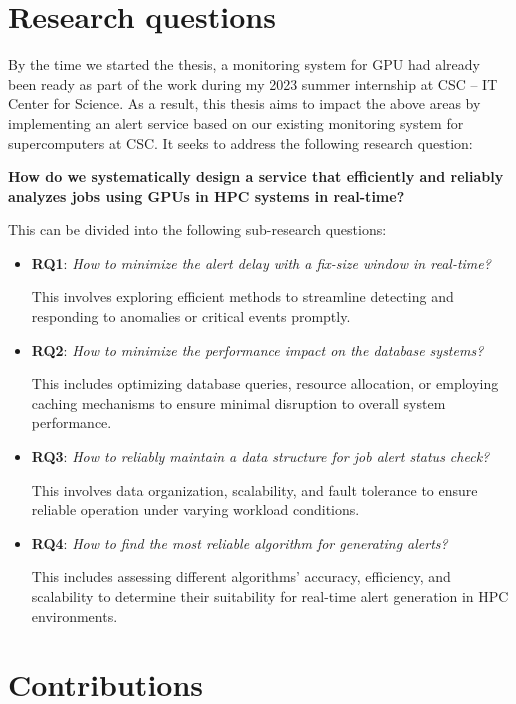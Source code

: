 \section{Research questions}
\label{sec:rqs}
By the time we started the thesis, a monitoring system for GPU had already been ready as part of the work during my 2023 summer internship at CSC -- IT Center for Science. As a result, this thesis aims to impact the above areas by implementing an alert service based on our existing monitoring system for supercomputers at CSC. It seeks to address the following research question:

\textbf{
How do we systematically design a service that efficiently and reliably analyzes jobs using GPUs in HPC systems in real-time?
}

This can be divided into the following sub-research questions:

\begin{itemize}
    \item \textbf{RQ1}: \textit{How to minimize the alert delay with a fix-size window in real-time?}

This involves exploring efficient methods to streamline detecting and responding to anomalies or critical events promptly.

    \item \textbf{RQ2}: \textit{How to minimize the performance impact on the database systems?}

This includes optimizing database queries, resource allocation, or employing caching mechanisms to ensure minimal disruption to overall system performance.

    \item \textbf{RQ3}: \textit{How to reliably maintain a data structure for job alert status check?}

This involves data organization, scalability, and fault tolerance to ensure reliable operation under varying workload conditions.
    
    \item \textbf{RQ4}: \textit{How to find the most reliable algorithm for generating alerts?}

This includes assessing different algorithms' accuracy, efficiency, and scalability to determine their suitability for real-time alert generation in HPC environments.

\end{itemize}


\section{Contributions}

